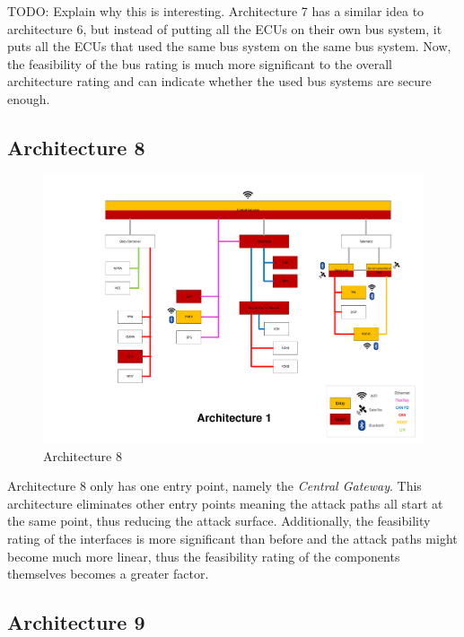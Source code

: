 TODO: Explain why this is interesting.
Architecture 7 has a similar idea to architecture 6, but instead of putting all the ECUs on their own bus system, it puts all the ECUs that used the same bus system on the same bus system.
Now, the feasibility of the bus rating is much more significant to the overall architecture rating and can indicate whether the used bus systems are secure enough.\par



\subsection*{Architecture 8}
\label{sec:arch8}

\begin{figure}[h!]
    \caption{Architecture 8}
    \includegraphics[width=\textwidth, page=8]{../Architectures-survey.pdf}
\end{figure}

Architecture 8 only has one entry point, namely the \textit{Central Gateway}. 
This architecture eliminates other entry points meaning the attack paths all start at the same point, thus reducing the attack surface.
Additionally, the feasibility rating of the interfaces is more significant than before and the attack paths might become much more linear, thus the feasibility rating of the components themselves becomes a greater factor.\par


\subsection*{Architecture 9}
\label{sec:arch9}

